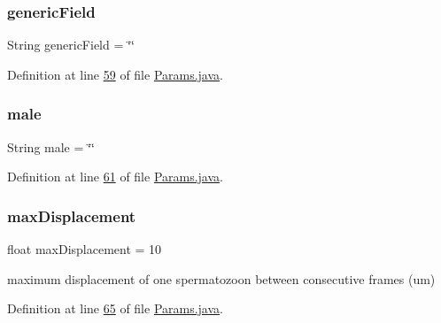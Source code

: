 \subsubsection{\texorpdfstring{generic\+Field}{genericField}}
{\footnotesize\ttfamily String generic\+Field = \char`\"{}\char`\"{}\hspace{0.3cm}{\ttfamily [static]}}



Definition at line \hyperlink{_params_8java_source_l00059}{59} of file \hyperlink{_params_8java_source}{Params.\+java}.

\hypertarget{classdata_1_1_params_a3e07114fb70a676dfe24fad6be8c3c75}{}\label{classdata_1_1_params_a3e07114fb70a676dfe24fad6be8c3c75} 
\subsubsection{\texorpdfstring{male}{male}}
{\footnotesize\ttfamily String male = \char`\"{}\char`\"{}\hspace{0.3cm}{\ttfamily [static]}}



Definition at line \hyperlink{_params_8java_source_l00061}{61} of file \hyperlink{_params_8java_source}{Params.\+java}.

\hypertarget{classdata_1_1_params_ab28f784a26ca9d2ce7d7a785b158aa61}{}\label{classdata_1_1_params_ab28f784a26ca9d2ce7d7a785b158aa61} 
\subsubsection{\texorpdfstring{max\+Displacement}{maxDisplacement}}
{\footnotesize\ttfamily float max\+Displacement = 10\hspace{0.3cm}{\ttfamily [static]}}

maximum displacement of one spermatozoon between consecutive frames (um) 

Definition at line \hyperlink{_params_8java_source_l00065}{65} of file \hyperlink{_params_8java_source}{Params.\+java}.

\hypertarget{classdata_1_1_params_a11078ae453283411c72774c45caa7519}{}\label{classdata_1_1_params_a11078ae453283411c72774c45caa7519} 
